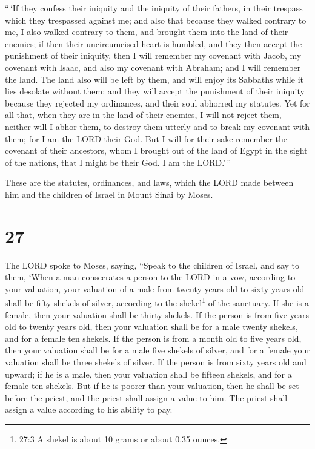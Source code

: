  ``\,`If they confess their iniquity and the iniquity of
their fathers, in their trespass which they trespassed against me; and
also that because they walked contrary to me,  I also
walked contrary to them, and brought them into the land of their
enemies; if then their uncircumcised heart is humbled, and they then
accept the punishment of their iniquity,  then I will
remember my covenant with Jacob, my covenant with Isaac, and also my
covenant with Abraham; and I will remember the land.  The
land also will be left by them, and will enjoy its Sabbaths while it
lies desolate without them; and they will accept the punishment of their
iniquity because they rejected my ordinances, and their soul abhorred my
statutes.  Yet for all that, when they are in the land of
their enemies, I will not reject them, neither will I abhor them, to
destroy them utterly and to break my covenant with them; for I am the
LORD their God.  But I will for their sake remember the
covenant of their ancestors, whom I brought out of the land of Egypt in
the sight of the nations, that I might be their God. I am the LORD.'\,''

 These are the statutes, ordinances, and laws, which the
LORD made between him and the children of Israel in Mount Sinai by
Moses.

\hypertarget{section-26}{%
\section{27}\label{section-26}}

 The LORD spoke to Moses, saying,  ``Speak to
the children of Israel, and say to them, `When a man consecrates a
person to the LORD in a vow, according to your valuation, 
your valuation of a male from twenty years old to sixty years old shall
be fifty shekels of silver, according to the shekel\footnote{27:3 A
  shekel is about 10 grams or about 0.35 ounces.} of the sanctuary.
 If she is a female, then your valuation shall be thirty
shekels.  If the person is from five years old to twenty
years old, then your valuation shall be for a male twenty shekels, and
for a female ten shekels.  If the person is from a month old
to five years old, then your valuation shall be for a male five shekels
of silver, and for a female your valuation shall be three shekels of
silver.  If the person is from sixty years old and upward;
if he is a male, then your valuation shall be fifteen shekels, and for a
female ten shekels.  But if he is poorer than your
valuation, then he shall be set before the priest, and the priest shall
assign a value to him. The priest shall assign a value according to his
ability to pay.

